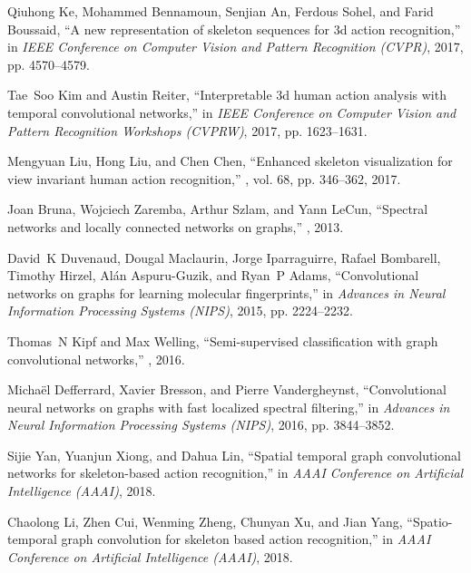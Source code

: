 \documentclass[conference]{IEEEtran}
\begin{document}
\begin{thebibliography}{10}
  Qiuhong Ke, Mohammed Bennamoun, Senjian An, Ferdous Sohel, and Farid Boussaid,
  \newblock ``A new representation of skeleton sequences for 3d action
    recognition,''
  \newblock in {\em IEEE Conference on Computer Vision and Pattern Recognition
    (CVPR)}, 2017, pp. 4570--4579.
  
  Tae~Soo Kim and Austin Reiter,
  \newblock ``Interpretable 3d human action analysis with temporal convolutional
    networks,''
  \newblock in {\em IEEE Conference on Computer Vision and Pattern Recognition
    Workshops (CVPRW)}, 2017, pp. 1623--1631.
  
  Mengyuan Liu, Hong Liu, and Chen Chen,
  \newblock ``Enhanced skeleton visualization for view invariant human action
    recognition,''
  , vol. 68, pp. 346--362, 2017.
  
  Joan Bruna, Wojciech Zaremba, Arthur Szlam, and Yann LeCun,
  \newblock ``Spectral networks and locally connected networks on graphs,''
  , 2013.
  
  David~K Duvenaud, Dougal Maclaurin, Jorge Iparraguirre, Rafael Bombarell,
    Timothy Hirzel, Al{\'a}n Aspuru-Guzik, and Ryan~P Adams,
  \newblock ``Convolutional networks on graphs for learning molecular
    fingerprints,''
  \newblock in {\em Advances in Neural Information Processing Systems (NIPS)},
    2015, pp. 2224--2232.
  
  Thomas~N Kipf and Max Welling,
  \newblock ``Semi-supervised classification with graph convolutional networks,''
  , 2016.
  
  Micha{\"e}l Defferrard, Xavier Bresson, and Pierre Vandergheynst,
  \newblock ``Convolutional neural networks on graphs with fast localized
    spectral filtering,''
  \newblock in {\em Advances in Neural Information Processing Systems (NIPS)},
    2016, pp. 3844--3852.
  
  Sijie Yan, Yuanjun Xiong, and Dahua Lin,
  \newblock ``Spatial temporal graph convolutional networks for skeleton-based
    action recognition,''
  \newblock in {\em AAAI Conference on Artificial Intelligence (AAAI)}, 2018.
  
  Chaolong Li, Zhen Cui, Wenming Zheng, Chunyan Xu, and Jian Yang,
  \newblock ``Spatio-temporal graph convolution for skeleton based action
    recognition,''
  \newblock in {\em AAAI Conference on Artificial Intelligence (AAAI)}, 2018.
  

\end{thebibliography}
\end{document}
